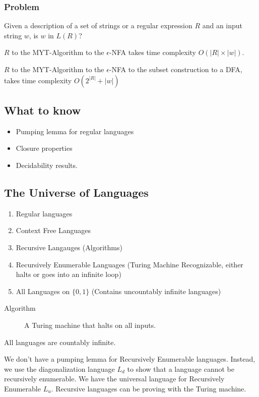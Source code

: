\documentclass[]{article}
\begin{document}
\subsubsection*{Problem}
Given a description of a set of strings or a regular expression $R$ and an input
string $w$, is $w$ in $L(R)$?

$R$ to the MYT-Algorithm to the $\epsilon$-NFA takes time complexity
$O(|R|\times|w|)$.

$R$ to the MYT-Algorithm to the $\epsilon$-NFA to the subset construction to a
DFA, takes time complexity $O(2^|R|+|w|)$

\subsection*{What to know}
\begin{itemize}
\item Pumping lemma for regular languages
\item Closure properties
\item Decidability results.
\end{itemize}

\subsection*{The Universe of Languages}
\begin{enumerate}
\item Regular languages
\item Context Free Languages
\item Recursive Langauges (Algorithms)
\item Recursively Enumerable Languages (Turing Machine Recognizable, either
halts or goes into an infinite loop)
\item All Languages on $\{0,1\}$ (Contains uncountably infinite languages)
\end{enumerate}

\begin{description}
\item[Algorithm] A Turing machine that halts on all inputs.
\end{description}

All languages are countably infinite.

We don't have a pumping lemma for Recursively Enumerable languages. Instead, we
use the diagonalization language $L_d$ to show that a language cannot be
recursively enumerable. We have the universal language for Recursively
Enumerable $L_u$. Recursive languages can be proving with the Turing machine.
\end{document}
